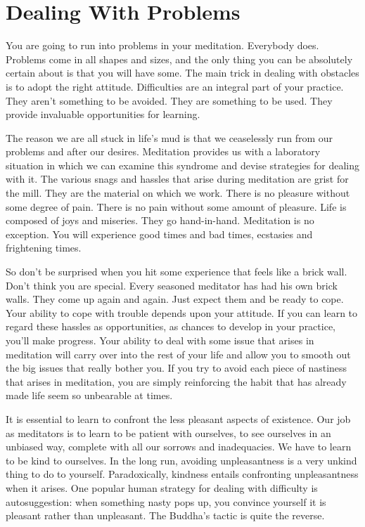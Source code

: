 \chapter{ Dealing With Problems}
You are going to run into problems in your
meditation. Everybody does. Problems come in all shapes and sizes, and the only
thing you can be absolutely certain about is that you will have some. The main
trick in dealing with obstacles is to adopt the right attitude. Difficulties are
an integral part of your practice. They aren't something to be avoided. They are
something to be used. They provide invaluable opportunities for learning.

The reason we are all stuck in life's mud is that we ceaselessly run from our
problems and after our desires. Meditation provides us with a laboratory
situation in which we can examine this syndrome and devise strategies for
dealing with it. The various snags and hassles that arise during meditation are
grist for the mill. They are the material on which we work. There is no pleasure
without some degree of pain. There is no pain without some amount of pleasure.
Life is composed of joys and miseries. They go hand-in-hand. Meditation is no
exception. You will experience good times and bad times, ecstasies and
frightening times.

So don't be surprised when you hit some experience that feels like a brick wall.
Don't think you are special. Every seasoned meditator has had his own brick
walls. They come up again and again. Just expect them and be ready to cope. Your
ability to cope with trouble depends upon your attitude. If you can learn to
regard these hassles as opportunities, as chances to develop in your practice,
you'll make progress. Your ability to deal with some issue that arises in
meditation will carry over into the rest of your life and allow you to smooth
out the big issues that really bother you. If you try to avoid each piece of
nastiness that arises in meditation, you are simply reinforcing the habit that
has already made life seem so unbearable at times.

It is essential to learn to confront the less pleasant aspects of existence. Our
job as meditators is to learn to be patient with ourselves, to see ourselves in
an unbiased way, complete with all our sorrows and inadequacies. We have to
learn to be kind to ourselves. In the long run, avoiding unpleasantness is a
very unkind thing to do to yourself. Paradoxically, kindness entails confronting
unpleasantness when it arises. One popular human strategy for dealing with
difficulty is autosuggestion: when something nasty pops up, you convince
yourself it is pleasant rather than unpleasant. The Buddha's tactic is quite the
reverse.


